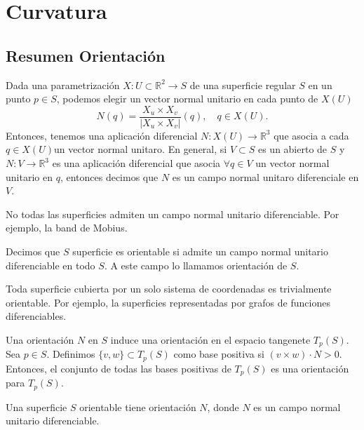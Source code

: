 \chapter{Curvatura}

\section{Resumen Orientación}

\begin{note}
  Dada una parametrización $X : U \subset \mathbb{R}^{2} \to S$ de una superficie regular $S$ en un punto $p \in S$, podemos elegir un vector normal unitario en cada punto de $X(U)$
  \[ 
    N(q) = \frac{X_{u} \times X_{v}}{| X_{u} \times X_{v} |} (q), \quad q \in X(U).
  \] 
  Entonces, tenemos una aplicación diferencial $N : X(U) \to \mathbb{R}^{3}$ que asocia a cada $ q \in X(U)$un vector normal unitaro. En general, si $V \subset S$ es un abierto de $S$ y $N : V \to \mathbb{R}^{3}$ es una aplicación diferencial que asocia $\forall q \in V$ un vector normal unitario en $q$, entonces decimos que $N$ es un campo normal unitaro diferenciale en $V$.
\end{note}

\begin{obs}
  No todas las superficies admiten un campo normal unitario diferenciable. Por ejemplo, la band de Mobius.
\end{obs}

\begin{defn}
  Decimos que $S$ superficie es orientable si admite un campo normal unitario diferenciable en todo $S$. A este campo lo llamamos orientación de $S$.
\end{defn}

\begin{obs}
  Toda superficie cubierta por un solo sistema de coordenadas es trivialmente orientable. Por ejemplo, la superficies representadas por grafos de funciones diferenciables.
\end{obs}

\begin{prop}
  Una orientación $N$ en $S$ induce una orientación en el espacio tangenete $T_{p}(S)$. Sea $p \in S$. Definimos $\{ v, w \} \subset T_{p}(S)$ como base positiva si $(v \times w) \cdot N > 0$. Entonces, el conjunto de todas las bases positivas de $T_{p}(S)$ es una orientación para $T_{p}(S)$.
\end{prop}

\begin{nota}
  Una superficie $S$ orientable tiene orientación $N$, donde $N$ es un campo normal unitario diferenciable.
\end{nota}

